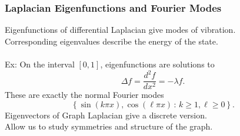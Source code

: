 \documentclass{beamer}
\begin{document}
\begin{frame}
  \frametitle{Laplacian Eigenfunctions and Fourier Modes}
  Eigenfunctions of differential Laplacian give modes of vibration.\\
  Corresponding eigenvalues describe the energy of the state.\\~\\
  Ex: On the interval $[0,1]$, eigenfunctions are solutions to
  \[\Delta f = \frac{d^2f}{dx^2} = - \lambda f.\]
  \hspace*{20pt} These are exactly the normal Fourier modes
  \[\left\{\sin(k\pi x), \cos(\ell \pi x)\, :\, k \geq 1, \ell \geq 0\right\}.\]
  Eigenvectors of Graph Laplacian give a discrete version.\\
  Allow us to study symmetries and structure of the graph.
\end{frame}

\end{document}
